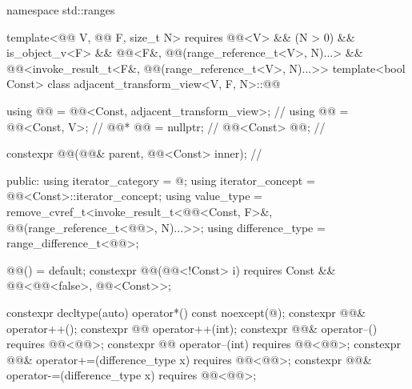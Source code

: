 %
\begin{codeblock}
namespace std::ranges {
  template<@@ V, @@ F, size_t N>
    requires @@<V> && (N > 0) && is_object_v<F> &&
             @@<F&, @@(range_reference_t<V>, N)...> &&
             @@<invoke_result_t<F&, @@(range_reference_t<V>, N)...>>
  template<bool Const>
  class adjacent_transform_view<V, F, N>::@@ {
    using @@ = @@<Const, adjacent_transform_view>;         // \expos
    using @@ = @@<Const, V>;                                 // \expos
    @@* @@ = nullptr;                                          // \expos
    @@<Const> @@;                                       // \expos

    constexpr @@(@@& parent, @@<Const> inner);    // \expos

  public:
    using iterator_category = @\seebelow@;
    using iterator_concept  = @@<Const>::iterator_concept;
    using value_type =
      remove_cvref_t<invoke_result_t<@@<Const, F>&,
                                     @@(range_reference_t<@@>, N)...>>;
    using difference_type = range_difference_t<@@>;

    @@() = default;
    constexpr @@(@@<!Const> i)
      requires Const && @@<@@<false>, @@<Const>>;

    constexpr decltype(auto) operator*() const noexcept(@\seebelow@);
    constexpr @@& operator++();
    constexpr @@ operator++(int);
    constexpr @@& operator--() requires @@<@@>;
    constexpr @@ operator--(int) requires @@<@@>;
    constexpr @@& operator+=(difference_type x) requires @@<@@>;
    constexpr @@& operator-=(difference_type x) requires @@<@@>;

}}
\end{codeblock}
